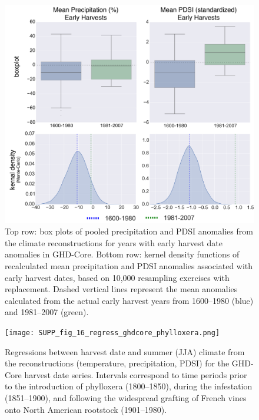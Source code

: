 \documentclass[12pt]{article}
\begin{document}
\begin{figure}
\center
\includegraphics[width=1.0\columnwidth,scale=2]{SUPP_fig_15_JJA_boxplot_monte.png}
\caption{Top row: box plots of pooled precipitation and PDSI anomalies from the climate reconstructions for years with early harvest date anomalies in GHD-Core. Bottom row: kernel density functions of recalculated mean precipitation and PDSI anomalies associated with early harvest dates, based on 10,000 resampling exercises with replacement. Dashed vertical lines represent the mean anomalies calculated from the actual early harvest years from 1600--1980 (blue) and 1981--2007 (green).}
\end{figure}

\begin{figure}
\center
\texttt{[image: SUPP\_fig\_16\_regress\_ghdcore\_phylloxera.png]}
\caption{Regressions between harvest date and summer (JJA) climate from the reconstructions (temperature, precipitation, PDSI) for the GHD-Core harvest date series. Intervals correspond to time periods prior to the introduction of phylloxera (1800--1850), during the infestation (1851--1900), and following the widespread grafting of French vines onto North American rootstock (1901--1980).}
\end{figure}
\end{document}

